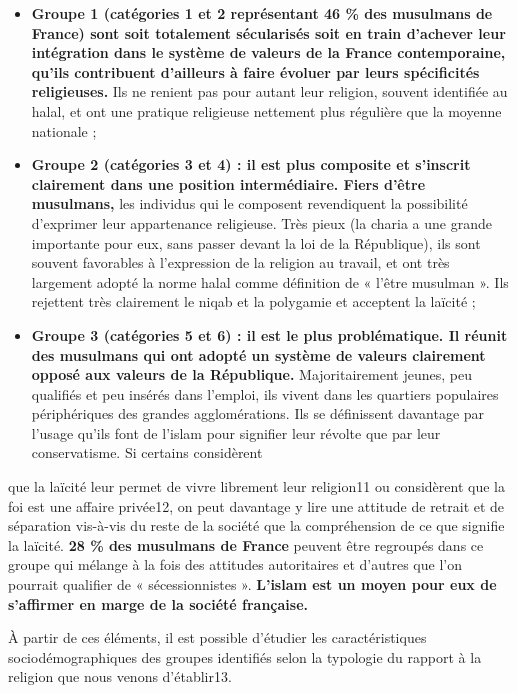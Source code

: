 \begin{itemize}
\item
  \textbf{Groupe 1 (catégories 1 et 2 représentant 46 \% des musulmans
  de France) sont soit totalement sécularisés soit en train d'achever
  leur intégration dans le système de valeurs de la France
  contemporaine, qu'ils contribuent d'ailleurs à faire évoluer par leurs
  spécificités religieuses.} Ils ne renient pas pour autant leur
  religion, souvent identifiée au halal, et ont une pratique religieuse
  nettement plus régulière que la moyenne nationale ;
\item
  \textbf{Groupe 2 (catégories 3 et 4) : il est plus composite et
  s'inscrit clairement dans une position intermédiaire. Fiers d'être
  musulmans,} les individus qui le composent revendiquent la possibilité
  d'exprimer leur appartenance religieuse. Très pieux (la charia a une
  grande importante pour eux, sans passer devant la loi de la
  République), ils sont souvent favorables à l'expression de la religion
  au travail, et ont très largement adopté la norme halal comme
  définition de « l'être musulman ». Ils rejettent très clairement le
  niqab et la polygamie et acceptent la laïcité ;
\item
  \textbf{Groupe 3 (catégories 5 et 6) : il est le plus problématique.
  Il réunit des musulmans qui ont adopté un système de valeurs
  clairement opposé aux valeurs de la République.} Majoritairement
  jeunes, peu qualifiés et peu insérés dans l'emploi, ils vivent dans
  les quartiers populaires périphériques des grandes agglomérations. Ils
  se définissent davantage par l'usage qu'ils font de l'islam pour
  signifier leur révolte que par leur conservatisme. Si certains
  considèrent
\end{itemize}




que la laïcité leur permet de vivre librement leur religion11 ou
considèrent que la foi est une affaire privée12, on peut davantage y
lire une attitude de retrait et de séparation vis-à-vis du reste de la
société que la compréhension de ce que signifie la laïcité. \textbf{28
\% des musulmans de France} peuvent être regroupés dans ce groupe qui
mélange à la fois des attitudes autoritaires et d'autres que l'on
pourrait qualifier de « sécessionnistes ». \textbf{L'islam est un moyen
pour eux de s'affirmer en marge de la société française.}

À partir de ces éléments, il est possible d'étudier les caractéristiques
sociodémographiques des groupes identifiés selon la typologie du rapport
à la religion que nous venons d'établir13.



